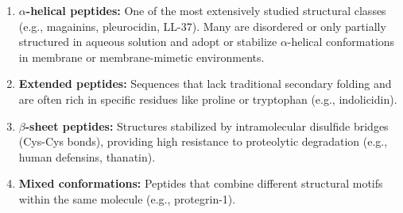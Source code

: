 \begin{enumerate}
    \item \textbf{$\alpha$-helical peptides:} One of the most extensively studied structural classes (e.g., magainins, pleurocidin, LL-37). Many are disordered or only partially structured in aqueous solution and adopt or stabilize $\alpha$-helical conformations in membrane or membrane-mimetic environments.
    
    \item \textbf{Extended peptides:} Sequences that lack traditional secondary folding and are often rich in specific residues like proline or tryptophan (e.g., indolicidin).
    
    \item \textbf{$\beta$-sheet peptides:} Structures stabilized by intramolecular disulfide bridges (Cys-Cys bonds), providing high resistance to proteolytic degradation (e.g., human defensins, thanatin).
    
    \item \textbf{Mixed conformations:} Peptides that combine different structural motifs within the same molecule (e.g., protegrin-1).
\end{enumerate}



